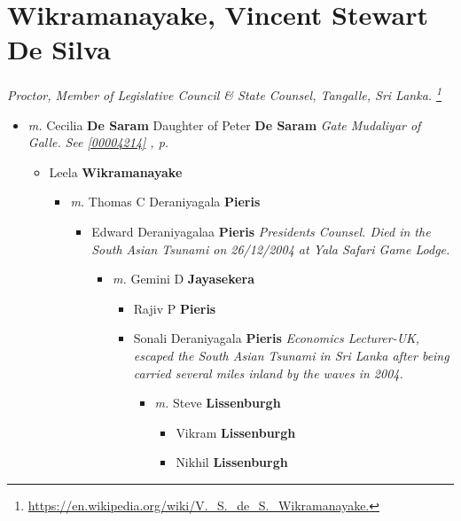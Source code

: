 \documentclass[10pt, openany]{book}
\begin{document}
\chapter{Wikramanayake, Vincent Stewart De Silva}
\label{00004057}
\textcolor{slmaroon}{\textit{Proctor, Member of Legislative Council \& State Counsel, Tangalle, Sri Lanka.
\footnote{\url{https://en.wikipedia.org/wiki/V._S._de_S._Wikramanayake.}}}}
\begin{itemize}
\item{\textit{m.} Cecilia \textbf{De Saram} \textcolor{slorange}{\textit{}} Daughter of  Peter \textbf{De Saram} \textcolor{slorange}{\textit{}} \textcolor{slmaroon}{\textit{Gate Mudaliyar of Galle.}} \textcolor{slteal}{\textit{See  \autoref{00004214} \textit{, p. \pageref{00004214} }}}   \label{couple:00004057:00004058} \begin{itemize}
\item{Leela \textbf{Wikramanayake} \textcolor{slorange}{\textit{}}
\begin{itemize}
\item{\textit{m.} Thomas C Deraniyagala \textbf{Pieris} \textcolor{slorange}{\textit{}}   \label{couple:00004059:00004060} \begin{itemize}
\item{Edward Deraniyagalaa \textbf{Pieris} \textcolor{slorange}{\textit{}} \textcolor{slmaroon}{\textit{Presidents Counsel.
Died in the South Asian Tsunami on 26/12/2004 at Yala Safari Game Lodge.}}
\begin{itemize}
\item{\textit{m.} Gemini D \textbf{Jayasekera} \textcolor{slorange}{\textit{}}   \label{couple:00004061:00004062} \begin{itemize}
\item{Rajiv P \textbf{Pieris} \textcolor{slorange}{\textit{}}
  }
\item{Sonali Deraniyagala \textbf{Pieris} \textcolor{slorange}{\textit{}} \textcolor{slmaroon}{\textit{Economics Lecturer-UK, escaped the South Asian Tsunami in Sri Lanka after being carried several miles inland by the waves in 2004.}}
\begin{itemize}
\item{\textit{m.} Steve \textbf{Lissenburgh} \textcolor{slorange}{\textit{}}   \label{couple:00004064:00004065} \begin{itemize}
\item{Vikram \textbf{Lissenburgh} \textcolor{slorange}{\textit{}}
 }
\item{Nikhil \textbf{Lissenburgh} \textcolor{slorange}{\textit{}}
}
\end{itemize}}
\end{itemize}}
\end{itemize}}
\end{itemize}}
\end{itemize}}
\end{itemize}}
\end{itemize}}
\end{itemize}
\end{document}
